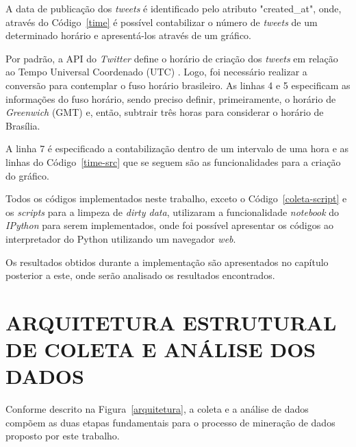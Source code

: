 

A data de publicação dos \textit{tweets} é identificado pelo atributo "created\_at", onde, através do Código~\ref{time} é possível contabilizar o número de \textit{tweets} de um determinado horário e apresentá-los através de um gráfico.

Por padrão, a API do \textit{Twitter} define o horário de criação dos \textit{tweets} em relação ao Tempo Universal Coordenado (UTC) \cite{twitter-doc}. Logo, foi necessário realizar a conversão para contemplar o fuso horário brasileiro. As linhas 4 e 5 especificam as informações do fuso horário, sendo preciso definir, primeiramente, o horário de \textit{Greenwich} (GMT) e, então, subtrair três horas para considerar o horário de Brasília.

A linha 7 é especificado a contabilização dentro de um intervalo de uma hora e as linhas do Código~\ref{time-src} que se seguem são as funcionalidades para a criação do gráfico.



Todos os códigos implementados neste trabalho, exceto o Código~\ref{coleta-script} e os \textit{scripts} para a limpeza de \textit{dirty data}, utilizaram a funcionalidade \textit{notebook} do \textit{IPython} para serem implementados, onde foi possível apresentar os códigos ao interpretador do Python utilizando um navegador \textit{web}.

Os resultados obtidos durante a implementação são apresentados no capítulo posterior a este, onde serão analisado os resultados encontrados.

\section{ARQUITETURA ESTRUTURAL DE COLETA E ANÁLISE DOS DADOS}
Conforme descrito na Figura~\ref{arquitetura}, a coleta e a análise de dados compõem as duas etapas fundamentais para o processo de mineração de dados proposto por este trabalho.


